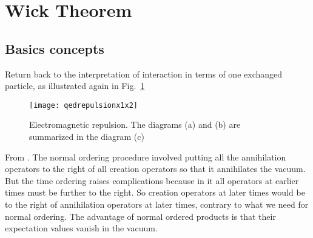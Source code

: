 \section{Wick Theorem}
\label{sec:wick-theorem}

\subsection{Basics concepts}
Return back to  the interpretation of interaction in terms of one exchanged particle, as illustrated again in Fig.~\ref{fig:qedrepulsionx1x2}
\begin{figure}
  \centering
  \texttt{[image: qedrepulsionx1x2]}
  \caption{Electromagnetic repulsion. The diagrams (a) and (b) are summarized in the diagram (c)}
  \label{fig:qedrepulsionx1x2}
\end{figure}


From \cite{Lahiri:2005sm}. The normal ordering procedure involved putting all the annihilation operators to the right of all creation operators so that it annihilates the vacuum. But the time ordering raises complications because in it all operators at earlier times must be further to the right. So creation operators at later times would be to the right of annihilation operators at later times, contrary to what we need for normal ordering. The advantage of normal ordered products is that their expectation values vanish in the vacuum. 

